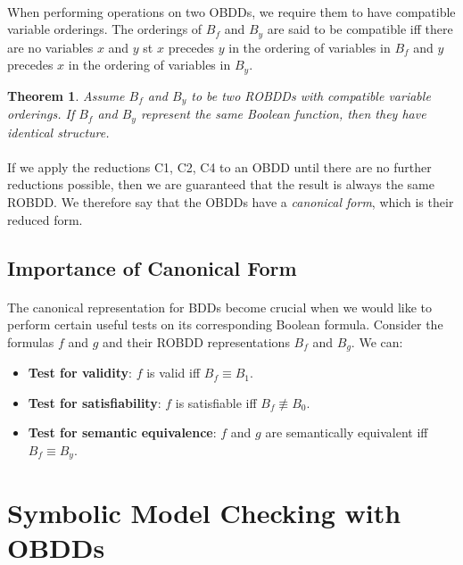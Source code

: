 \documentclass{article}
\theoremstyle{plain}
\newtheorem{thm}{Theorem}[section]
\theoremstyle{definition}
\begin{document}
\begin{multicols}{2}
\paragraph{} When performing operations on two OBDDs, we require them to have compatible variable orderings. The orderings of $B_f$ and $B_y$ are said to be compatible iff there are no variables $x$ and $y$ st $x$ precedes $y$ in the ordering of variables in $B_f$ and $y$ precedes $x$ in the ordering of variables in $B_y$.

\begin{thm}
Assume $B_f$ and $B_y$ to be two ROBDDs with compatible variable orderings. If $B_f$ and $B_y$ represent the same Boolean function, then they have identical structure.
\end{thm}

\paragraph{} If we apply the reductions C1, C2, C4 to an OBDD until there are no further reductions possible, then we are guaranteed that the result is always the same ROBDD. We therefore say that the OBDDs have a \textit{canonical form}, which is their reduced form.

\subsection{Importance of Canonical Form}

\paragraph{} The canonical representation for BDDs become crucial when we would like to perform certain useful tests on its corresponding Boolean formula. Consider the formulas $f$ and $g$ and their ROBDD representations $B_f$ and $B_g$. We can:

\begin{itemize}
\item \textbf{Test for validity}: $f$ is valid iff $B_f \equiv B_1$.
\item \textbf{Test for satisfiability}: $f$ is satisfiable iff $B_f \not\equiv B_0$.
\item \textbf{Test for semantic equivalence}: $f$ and $g$ are semantically equivalent iff $B_f \equiv B_y$.
\end{itemize}

\section{Symbolic Model Checking with OBDDs}


\end{multicols}
\end{document}
